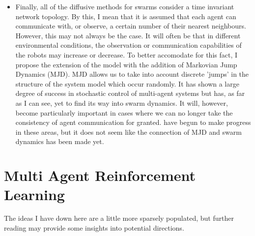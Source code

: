 \documentclass[preprint,11pt]{report}
\begin{document}
\begin{itemize}
\item Finally, all of the diffusive methods for swarms consider a time invariant network topology.
By this, I mean that it is assumed that each agent can communicate with, or observe, a certain
number of their nearest neighbours. However, this may not always be the case. It will often be that
in different environmental conditions, the observation or communication capabilities of the robots
may increase or decrease. To better accomodate for this fact, I propose the extension of the model
with the addition of Markovian Jump Dynamics (MJD). MJD allows us to take into account discrete
'jumps' in the structure of the system model which occur randomly. It has shown a large degree of
success in stochastic control of multi-agent systems but has, as far as I can see, yet to find its
way into swarm dynamics. It will, however, become particularly important in cases where we can no
longer take the consistency of agent communication for granted. 
\cite{FUHRMANFrancescoRUSSO,Ma2017,Li2017} have begun to make progress in these areas, but it does
not seem like the connection of MJD and swarm dynamics has been made yet.
\end{itemize}

\section{Multi Agent Reinforcement Learning}

The ideas I have down here are a little more sparsely populated, but further reading may provide
some insights into potential directions.
\end{document}
